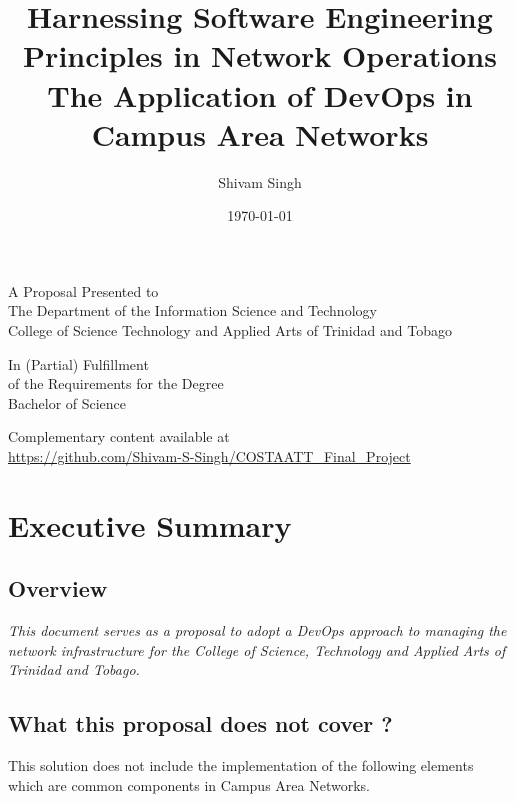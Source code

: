 \documentclass[12pt, letterpaper]{article}
\begin{document}
\title{Harnessing Software Engineering Principles in Network Operations \\
\vspace{0.5cm}
\large The Application of DevOps in Campus Area Networks}
\author{Shivam Singh}
\date{\today}
\maketitle

\vspace{1cm}

\begin{center}

A Proposal Presented to\\ 
The Department of the Information Science and Technology\\
College of Science Technology and Applied Arts of Trinidad and Tobago 

\vspace{1cm}

In (Partial) Fulfillment\\
of the Requirements for the Degree\\
Bachelor of Science

\vspace{1cm}

Complementary content available at \\
\url{https://github.com/Shivam-S-Singh/COSTAATT_Final_Project}


\end{center}

\newpage

\tableofcontents

\newpage

\section{Executive Summary}
	\subsection{Overview}
\begin{center}
\textit{This document serves as a proposal to adopt a DevOps approach to managing the network infrastructure for the College of Science, Technology and Applied Arts of Trinidad and Tobago.}
\end{center}
	\subsection{What this proposal does not cover ?}
This solution does not include the implementation of the following elements which are common components in Campus Area Networks.
\end{document}
